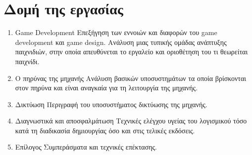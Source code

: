 \section{Δομή της εργασίας}
\begin{enumerate}
	\item{Game Development} Επεξήγηση των εννοιών και διαφορών του game development και game design. Ανάλυση μιας τυπικής ομάδας ανάπτυξης παιχνιδιών, στην οποία απευθύνεται το εργαλείο και οριοθέτηση του τι θεωρείται παιχνίδι.
	\item{Ο πηρύνας της μηχανής} Ανάλυση βασικών υποσυστημάτων τα οποία βρίσκονται στον πηρύνα και είναι αναγκαία για τη λειτουργία της μηχανής.
	\item{Δικτύωση} Περιγραφή του υποσυστήματος δικτύωσης της μηχανής.
	\item{Διαγνωστικά και αποσφαλμάτωση} Τεχνικές ελέγχου υγείας του λογισμικού τόσο κατά τη διαδικασία δημιουργίας όσο και στις τελικές εκδόσεις.
	\item{Επίλογος} Συμπεράσματα και τεχνικές επέκτασης.
\end{enumerate}
